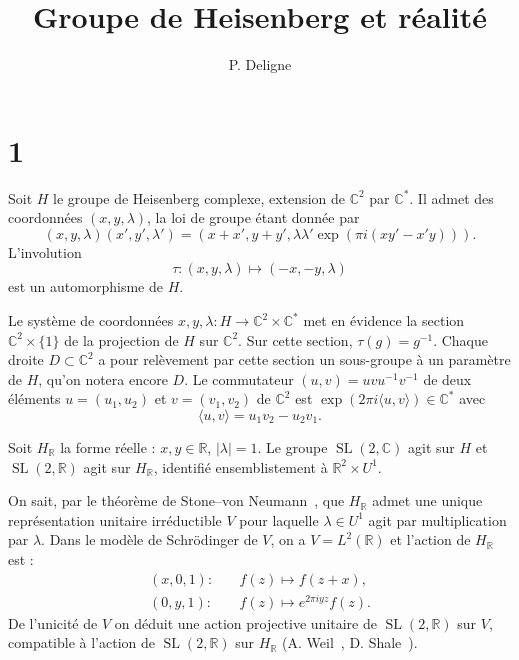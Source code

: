 \documentclass[11pt]{article}
\title{Groupe de Heisenberg et réalité}
\author{P. Deligne}
\date{}
\newcommand{\C}{\mathbb C}
\newcommand{\R}{\mathbb R}
\DeclareMathOperator{\SL}{SL}
\begin{document}
\maketitle

\section*{1}
Soit $H$ le groupe de Heisenberg complexe, extension de $\C^2$ par $\C^*$. Il admet des coordonnées $(x,y,\lambda)$, la loi de groupe étant donnée par
\begin{equation}\tag{1.1}
(x,y,\lambda)(x',y',\lambda')=(x+x',y+y',\lambda\lambda'\exp(\pi i(xy'-x'y))).
\end{equation}
L'involution
\begin{equation}\tag{1.2}
\tau:(x,y,\lambda)\longmapsto(-x,-y,\lambda)
\end{equation}
est un automorphisme de $H$.

Le système de coordonnées $x,y,\lambda:H\to\C^2\times\C^*$ met en évidence la section $\C^2\times\{1\}$ de la projection de $H$ sur $\C^2$. Sur cette section, $\tau(g)=g^{-1}$. Chaque droite $D\subset\C^2$ a pour relèvement par cette section un sous-groupe à un paramètre de $H$, qu'on notera encore $D$. Le commutateur $(u,v)=uvu^{-1}v^{-1}$ de deux éléments $u=(u_1,u_2)$ et $v=(v_1,v_2)$ de $\C^2$ est $\exp(2\pi i\langle u,v\rangle)\in\C^*$ avec
\begin{equation}\tag{1.3}
\langle u,v\rangle=u_1v_2-u_2v_1.
\end{equation}

Soit $H_\R$ la forme réelle : $x,y\in\R$, $|\lambda|=1$. Le groupe $\SL(2,\C)$ agit sur $H$ et $\SL(2,\R)$ agit sur $H_\R$, identifié ensemblistement à $\R^2\times U^1$.

On sait, par le théorème de Stone--von Neumann~\cite{vonNeumann}, que $H_\R$ admet une unique représentation unitaire irréductible $V$ pour laquelle $\lambda\in U^1$ agit par multiplication par $\lambda$. Dans le modèle de Schrödinger de $V$, on a $V=L^2(\R)$ et l'action de $H_\R$ est :
\begin{equation}\tag{1.4}
\begin{aligned}
(x,0,1):&\quad f(z)\longmapsto f(z+x),\\
(0,y,1):&\quad f(z)\longmapsto e^{2\pi i yz}f(z).
\end{aligned}
\end{equation}
De l'unicité de $V$ on déduit une action projective unitaire de $\SL(2,\R)$ sur $V$, compatible à l'action de $\SL(2,\R)$ sur $H_\R$ (A. Weil~\cite{Weil}, D. Shale~\cite{Shale}).
\end{document}
